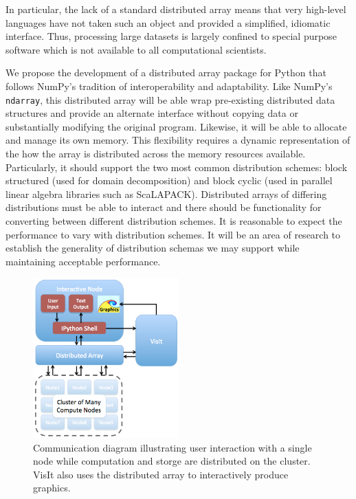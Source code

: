 \documentclass[letterpaper,11pt]{article}
\begin{document}
In particular, the lack of a standard distributed array means that very high-level 
languages have not taken such an object and provided a simplified, idiomatic interface.
Thus, processing large datasets is largely confined to special purpose software which is 
not available to all computational scientists.

We propose the development of a distributed array package for Python that follows NumPy's 
tradition of interoperability and adaptability.  Like NumPy's \texttt{ndarray}, this 
distributed array will be able wrap pre-existing distributed data structures and provide 
an alternate interface without copying data or substantially modifying the original program.  
Likewise, it 
will be able to allocate and manage its own memory.  This flexibility requires a dynamic 
representation of the how the array is distributed across the memory resources available.  
Particularly, it should support the two most common distribution schemes: block structured 
(used for domain decomposition) and block cyclic (used in parallel linear algebra libraries 
such as ScaLAPACK\cite{scalapack}).  Distributed arrays of differing distributions must be 
able to interact and there should be functionality for converting between different 
distribution schemes.  It is reasonable to expect the performance to vary with distribution 
schemes.  It will be an area of research to establish the generality of distribution 
schemas we may support while maintaining acceptable performance.

\begin{figure}
	\vspace{-15pt}
	\begin{center}
		\includegraphics[width=0.50\textwidth]{flowchart.jpg}
	\end{center}
	\caption{Communication diagram illustrating user interaction with a single node
		while computation and storge are distributed on the cluster.  VisIt also
		uses the distributed array to interactively produce graphics.  }
	\label{fig:communication}
	\vspace{-10pt}
\end{figure}
\end{document}
